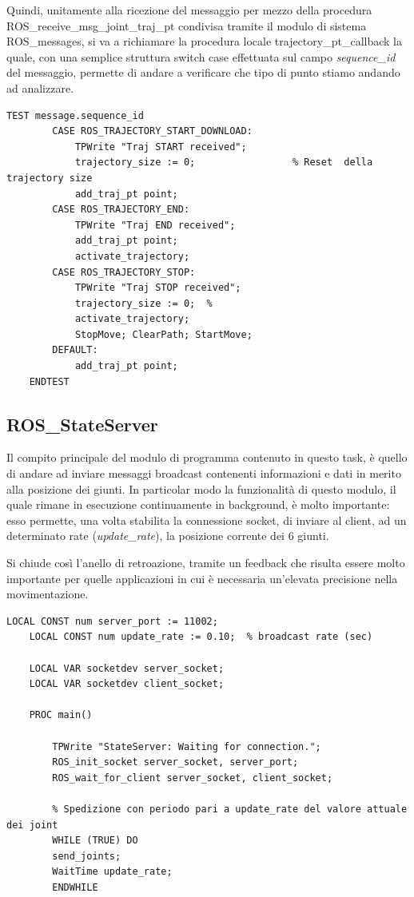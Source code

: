 Quindi, unitamente alla ricezione del messaggio per mezzo della procedura ROS\_receive\_msg\_joint\_traj\_pt condivisa tramite il modulo di sistema ROS\_messages, si va a richiamare la procedura locale trajectory\_pt\_callback la quale, con una semplice struttura switch case effettuata sul campo \emph{sequence\_id} del messaggio, permette di andare a verificare che tipo di punto stiamo andando ad analizzare.
\begin{lstlisting}[style=Matlab-editor,caption=Struttura che permette di riconoscere la natura del punto da aggiungere alla traiettoria in esame,captionpos=b,label={Code:ROSMotionServer2},basicstyle=\scriptsize\ttfamily,frame=trBL]
	TEST message.sequence_id
		CASE ROS_TRAJECTORY_START_DOWNLOAD:
			TPWrite "Traj START received";
			trajectory_size := 0;                 % Reset  della trajectory size
			add_traj_pt point;              
		CASE ROS_TRAJECTORY_END:
			TPWrite "Traj END received";
			add_traj_pt point;                    
			activate_trajectory;
		CASE ROS_TRAJECTORY_STOP:
			TPWrite "Traj STOP received";
			trajectory_size := 0;  %
			activate_trajectory;
			StopMove; ClearPath; StartMove; 
		DEFAULT:
			add_traj_pt point;            
	ENDTEST
\end{lstlisting}


\subsection{ROS\_StateServer}
Il compito principale del modulo di programma contenuto in questo task, è quello di andare ad inviare messaggi broadcast contenenti informazioni e dati in merito alla posizione dei giunti.
In particolar modo la funzionalità di questo modulo, il quale rimane in esecuzione continuamente in background, è molto importante: esso permette, una volta stabilita la connessione socket, di inviare al client, ad un determinato rate (\emph{update\_rate}), la posizione corrente dei 6 giunti. 

Si chiude così l'anello di retroazione, tramite un feedback che risulta essere molto importante per quelle applicazioni in cui è necessaria un'elevata precisione nella movimentazione.  
\begin{lstlisting}[style=Matlab-editor,caption=Feedback continuo della posizione del manipolatore,captionpos=b,label={Code:ContinuosFeedBack},basicstyle=\scriptsize\ttfamily,frame=trBL]
	LOCAL CONST num server_port := 11002;
	LOCAL CONST num update_rate := 0.10;  % broadcast rate (sec)
	
	LOCAL VAR socketdev server_socket;
	LOCAL VAR socketdev client_socket;
	
	PROC main()
	
		TPWrite "StateServer: Waiting for connection.";
		ROS_init_socket server_socket, server_port;
		ROS_wait_for_client server_socket, client_socket;
		
		% Spedizione con periodo pari a update_rate del valore attuale dei joint
		WHILE (TRUE) DO
		send_joints;
		WaitTime update_rate;
		ENDWHILE
\end{lstlisting}

